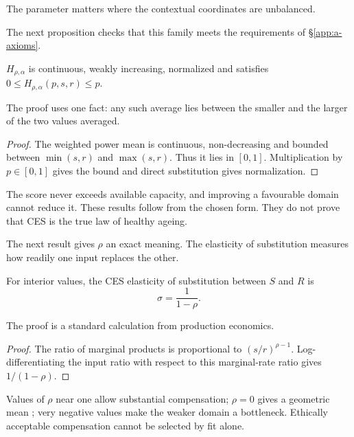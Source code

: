 \noindent The parameter matters where the contextual coordinates are
unbalanced.

The next proposition checks that this family meets the requirements of
\S\ref{app:a-axioms}.

\begin{proposition}[Admissibility]
$H_{\rho,\alpha}$ is continuous, weakly increasing, normalized and satisfies
$0\le H_{\rho,\alpha}(p,s,r)\le p$.
\end{proposition}
The proof uses one fact: any such average lies between the smaller and the
larger of the two values averaged.
\begin{proof}
The weighted power mean is continuous, non-decreasing and bounded between
$\min(s,r)$ and $\max(s,r)$. Thus it lies in $[0,1]$. Multiplication by
$p\in[0,1]$ gives the bound and direct substitution gives normalization.
\end{proof}

\begin{remark}
The score never exceeds available capacity, and improving a favourable domain
cannot reduce it. These results follow from the chosen form. They do not prove
that CES is the true law of healthy ageing.
\end{remark}

The next result gives $\rho$ an exact meaning. The elasticity of substitution
measures how readily one input replaces the other.

\begin{proposition}
For interior values, the CES elasticity of substitution between $S$ and $R$ is
\citep{arrow_chenery_1961}
\[
\sigma=\frac{1}{1-\rho}.
\]
\end{proposition}
The proof is a standard calculation from production economics.
\begin{proof}
The ratio of marginal products is proportional to $(s/r)^{\rho-1}$.
Log-differentiating the input ratio with respect to this marginal-rate ratio
gives $1/(1-\rho)$.
\end{proof}

\begin{remark}
Values of $\rho$ near one allow substantial compensation; $\rho=0$ gives a
geometric mean \citep{hardy_littlewood_polya_1934}; very negative values make the weaker domain a bottleneck.
Ethically acceptable compensation cannot be selected by fit alone.
\end{remark}


